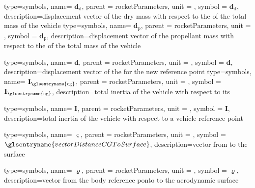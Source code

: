 {type=symbols,
  name= \ensuremath{\mathbf{d}_\mathrm{d}},
  parent = {rocketParameters},
  unit = \unexpanded{\si{\meter}},
  symbol = \ensuremath{\mathbf{d}_\mathrm{d}},
  description={displacement vector of the dry mass with respect to the  of the total mass of the vehicle}
}
{type=symbols,
  name= \ensuremath{\mathbf{d}_\mathrm{p}},
  parent = {rocketParameters},
  unit = \unexpanded{\si{\meter}},
  symbol = \ensuremath{\mathbf{d}_\mathrm{p}},
  description={displacement vector of the propellant mass with respect to the  of the total mass of the vehicle}
}

{type=symbols,
  name= \ensuremath{\mathbf{d}},
  parent = {rocketParameters},
  unit = \unexpanded{\si{\meter}},
  symbol = \ensuremath{\mathbf{d}},
  description={displacement vector of the   for the new reference point}
}
{type=symbols,
  name= \ensuremath{\mathbf{I}_\mathrm{\glsentryname{cg}}},
  parent = {rocketParameters},
  unit = \unexpanded{\si{\kilogram\meter\squared}},
  symbol = \ensuremath{\mathbf{I}_\mathrm{\glsentryname{cg}}},
  description={total inertia of the vehicle with respect to its }
}

{type=symbols,
  name= \ensuremath{\mathbf{I}},
  parent = {rocketParameters},
  unit = \unexpanded{\si{\kilogram\meter\squared}},
  symbol = \ensuremath{\mathbf{I}},
  description={total inertia of the vehicle with respect to a vehicle reference point}
}

{type=symbols,
  name= \ensuremath{\boldsymbol{\varsigma}},
  parent = {rocketParameters},
  unit = \unexpanded{\si{\meter}},
  symbol = \ensuremath{\glsentryname{vectorDistanceCGToSurface}},
  description={vector from  to the surface}  
}

{type=symbols,
  name= \ensuremath{\boldsymbol{\varrho}},
  parent = {rocketParameters},
  unit = \unexpanded{\si{\meter}},
  symbol = \ensuremath{\boldsymbol{\varrho}},
  description={vector from the body reference ponto to the aerodynamic surface}  
}